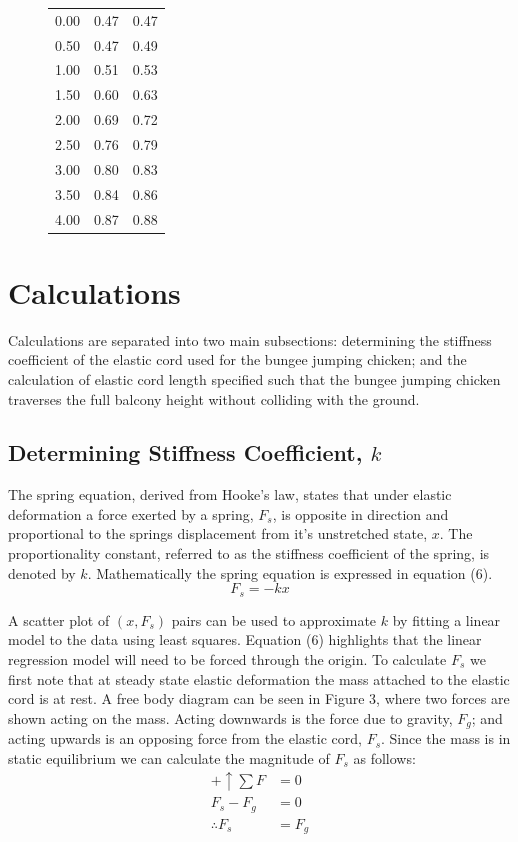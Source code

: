\documentclass[a4paper]{article}
\newlength{\arrow}
\begin{document}
\begin{figure}[h]
\begin{minipage}{0.45\textwidth}
\begin{tabular}{rrr}
				\midrule
				0.00 & 0.47 & 0.47\\
				0.50 & 0.47 & 0.49\\
				1.00 & 0.51 & 0.53\\
				1.50 & 0.60 & 0.63\\
				2.00 & 0.69 & 0.72\\
				2.50 & 0.76 & 0.79\\
				3.00 & 0.80 & 0.83\\
				3.50 & 0.84 & 0.86\\
				4.00 & 0.87 & 0.88\\
				\bottomrule
			\end{tabular}
	\end{minipage}
\end{figure}


\section{Calculations}
Calculations are separated into two main subsections: determining the stiffness coefficient of the elastic cord used for the bungee jumping chicken; and the calculation of elastic cord length specified such that the bungee jumping chicken traverses the full balcony height without colliding with the ground.

\subsection{Determining Stiffness Coefficient, $k$}
The spring equation, derived from Hooke's law, states that under elastic deformation a force exerted by a spring, $F_s$, is opposite in direction and proportional to the springs displacement from it's unstretched state, $x$. The proportionality constant, referred to as the stiffness coefficient of the spring, is denoted by $k$. Mathematically the spring equation is expressed in equation (6).
\begin{equation}
F_s = -kx
\end{equation} 

A scatter plot of $(x, F_s)$ pairs can be used to approximate $k$ by fitting a linear model to the data using least squares. Equation (6) highlights that the linear regression model will need to be forced through the origin. To calculate $F_s$ we first note that at steady state elastic deformation the mass attached to the elastic cord is at rest. A free body diagram can be seen in Figure 3, where two forces are shown acting on the mass. Acting downwards is the force due to gravity, $F_g$; and acting upwards is an opposing force from the elastic cord, $F_s$. Since the mass is in static equilibrium we can calculate the magnitude of $F_s$ as follows:
\begin{align}
+ \uparrow \sum F &= 0 \nonumber \\
F_s - F_g &= 0 \nonumber \\
\therefore F_s &= F_g
\end{align} 
\end{document}
